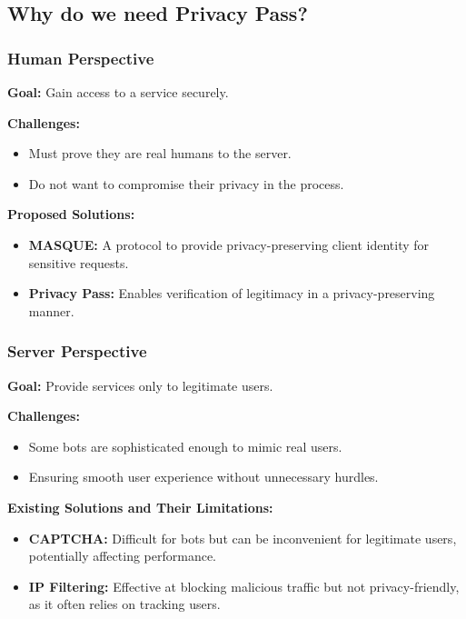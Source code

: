 \subsection{Why do we need Privacy Pass?}
\begin{multicols}{2}
\subsubsection{Human Perspective}
\textbf{Goal:} Gain access to a service securely.

\textbf{Challenges:}
\begin{itemize}[topsep=0pt]
    \item Must prove they are real humans to the server.
    \item Do not want to compromise their privacy in the process.
\end{itemize}

\textbf{Proposed Solutions:}
\begin{itemize}[topsep=0pt]
    \item \textbf{MASQUE:} A protocol to provide privacy-preserving client identity for sensitive requests.
    \item \textbf{Privacy Pass:} Enables verification of legitimacy in a privacy-preserving manner.
\end{itemize}

\columnbreak

\subsubsection{Server Perspective}
\textbf{Goal:} Provide services only to legitimate users.

\textbf{Challenges:}
\begin{itemize}[topsep=0pt]
    \item Some bots are sophisticated enough to mimic real users.
    \item Ensuring smooth user experience without unnecessary hurdles.
\end{itemize}

\textbf{Existing Solutions and Their Limitations:}
\begin{itemize}[topsep=0pt]
    \item \textbf{CAPTCHA:} Difficult for bots but can be inconvenient for legitimate users, potentially affecting performance.
    \item \textbf{IP Filtering:} Effective at blocking malicious traffic but not privacy-friendly, as it often relies on tracking users.
\end{itemize}
\end{multicols}

